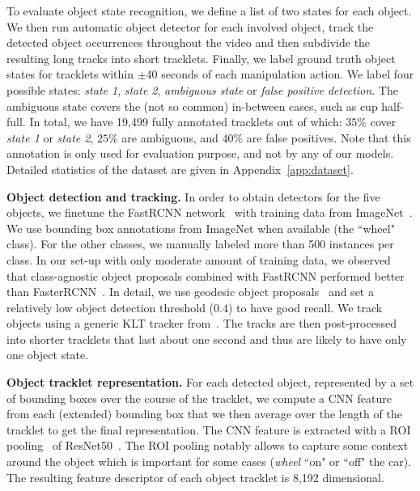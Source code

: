 %
%
%
%
%
%
%
%
%
%
%
%
%
%
%
%
%
%
%
%
%
%
%
%
To evaluate object state recognition, we define a list of two states for each object. %
We then run automatic object detector for each involved object, track the detected object occurrences throughout the video and then subdivide the resulting long tracks into short tracklets.
%
%
%
Finally, we label ground truth object states for tracklets within $\pm$40 seconds of each manipulation action.  
We label four possible states: \textit{state 1}, \textit{state 2}, \textit{ambiguous state} or \textit{false positive detection}.
The ambiguous state covers the (not so common) in-between cases, such as cup half-full.  
In total, we have 19,499 fully annotated tracklets out of which: $35\%$ cover \textit{state 1} or \textit{state 2}, $25\%$ are ambiguous, and $40\%$ are false positives.
Note that this annotation is only used for evaluation purpose, and not by any of our models.
Detailed statistics of the dataset are given in Appendix~\ref{app:dataset}.

\noindent\textbf{Object detection and tracking.}
In order to obtain detectors for the five objects, we finetune the FastRCNN network~\cite{girsh15fastrcnn} with training data from ImageNet~\cite{imagenet09}.
We use bounding box annotations from ImageNet when available (\eg the ``wheel" class).
For the other classes, we manually labeled more than 500 instances per class.
%
In our set-up with only moderate amount of training data, we observed that class-agnostic object proposals combined with FastRCNN performed better than FasterRCNN~\cite{ren2015faster}.
In detail, we use geodesic object proposals~\cite{kra2014gop} and set a relatively low object detection threshold ($0.4$) to have good recall.
We track objects using a generic KLT tracker from~\cite{Bojanowski13finding}.
The tracks are then post-processed into shorter tracklets that last about one second and thus are likely to have only one object state.
%

\noindent\textbf{Object tracklet representation.}
For each detected object, represented by a set of bounding boxes over the course of the tracklet, we compute a CNN feature from each (extended) bounding box that we then average over the length of the tracklet to get the final representation.
The CNN feature is extracted with a ROI pooling~\cite{ren2015faster} of ResNet50~\cite{he16resnet}.
The ROI pooling notably allows to capture some context around the object which is important for some cases (\eg \textit{wheel} ``on" or ``off" the car).
The resulting feature descriptor of each object tracklet is 8,192 dimensional.


